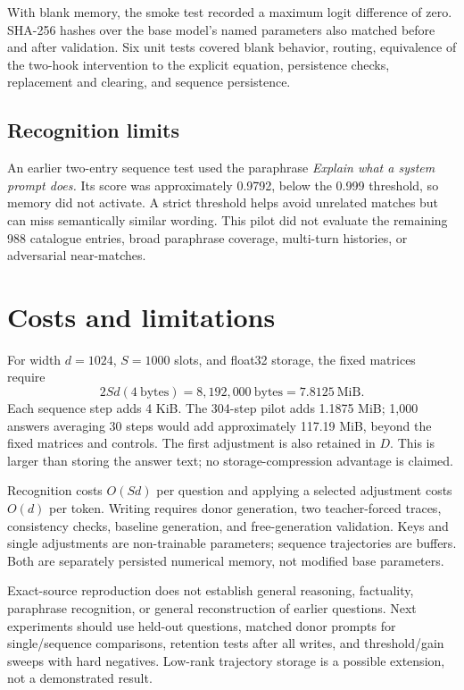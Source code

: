 \documentclass[manuscript,screen,nonacm]{acmart}
\begin{document}
With blank memory, the smoke test recorded a maximum logit difference of zero. SHA-256 hashes over the base model's named parameters also matched before and after validation. Six unit tests covered blank behavior, routing, equivalence of the two-hook intervention to the explicit equation, persistence checks, replacement and clearing, and sequence persistence.

\subsection{Recognition limits}
An earlier two-entry sequence test used the paraphrase \emph{Explain what a system prompt does.} Its score was approximately 0.9792, below the 0.999 threshold, so memory did not activate. A strict threshold helps avoid unrelated matches but can miss semantically similar wording. This pilot did not evaluate the remaining 988 catalogue entries, broad paraphrase coverage, multi-turn histories, or adversarial near-matches.

\section{Costs and limitations}
For width $d=1024$, $S=1000$ slots, and float32 storage, the fixed matrices require
\begin{equation}
2Sd(4\ \text{bytes})=8{,}192{,}000\ \text{bytes}=7.8125\ \text{MiB}.
\end{equation}
Each sequence step adds 4 KiB. The 304-step pilot adds 1.1875 MiB; 1,000 answers averaging 30 steps would add approximately 117.19 MiB, beyond the fixed matrices and controls. The first adjustment is also retained in $D$. This is larger than storing the answer text; no storage-compression advantage is claimed.

Recognition costs $O(Sd)$ per question and applying a selected adjustment costs $O(d)$ per token. Writing requires donor generation, two teacher-forced traces, consistency checks, baseline generation, and free-generation validation. Keys and single adjustments are non-trainable parameters; sequence trajectories are buffers. Both are separately persisted numerical memory, not modified base parameters.

Exact-source reproduction does not establish general reasoning, factuality, paraphrase recognition, or general reconstruction of earlier questions. Next experiments should use held-out questions, matched donor prompts for single/sequence comparisons, retention tests after all writes, and threshold/gain sweeps with hard negatives. Low-rank trajectory storage is a possible extension, not a demonstrated result.
\end{document}
